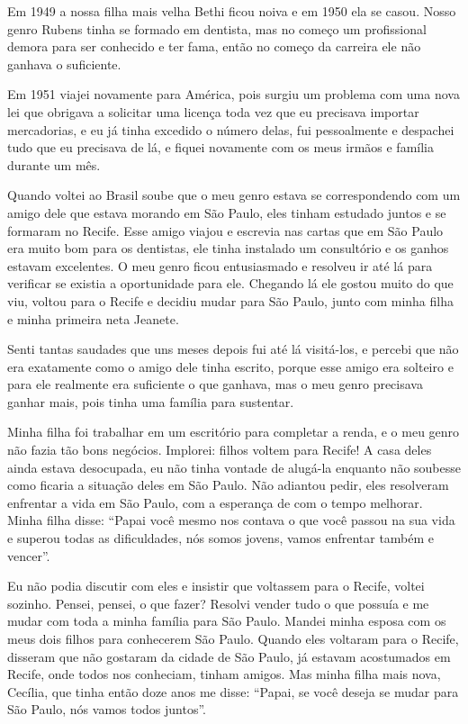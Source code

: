 Em 1949 a nossa filha mais velha Bethi ficou noiva e em 1950 ela se
casou. Nosso genro Rubens tinha se formado em dentista, mas no começo um
profissional demora para ser conhecido e ter fama, então no começo da
carreira ele não ganhava o suficiente.

Em 1951 viajei novamente para América, pois surgiu um problema com uma
nova lei que obrigava a solicitar uma licença toda vez que eu precisava
importar mercadorias, e eu já tinha excedido o número delas, fui
pessoalmente e despachei tudo que eu precisava de lá, e fiquei novamente
com os meus irmãos e família durante um mês.

Quando voltei ao Brasil soube que o meu genro estava se correspondendo
com um amigo dele que estava morando em São Paulo, eles tinham estudado
juntos e se formaram no Recife. Esse amigo viajou e escrevia nas cartas
que em São Paulo era muito bom para os dentistas, ele tinha instalado um
consultório e os ganhos estavam excelentes. O meu genro ficou
entusiasmado e resolveu ir até lá para verificar se existia a
oportunidade para ele. Chegando lá ele gostou muito do que viu, voltou
para o Recife e decidiu mudar para São Paulo, junto com minha filha e
minha primeira neta Jeanete.

Senti tantas saudades que uns meses depois fui até lá visitá-los, e
percebi que não era exatamente como o amigo dele tinha escrito, porque
esse amigo era solteiro e para ele realmente era suficiente o que
ganhava, mas o meu genro precisava ganhar mais, pois tinha uma família
para sustentar.

Minha filha foi trabalhar em um escritório para completar a renda, e o
meu genro não fazia tão bons negócios. Implorei: filhos voltem para
Recife! A casa deles ainda estava desocupada, eu não tinha vontade de
alugá-la enquanto não soubesse como ficaria a situação deles em São
Paulo. Não adiantou pedir, eles resolveram enfrentar a vida em São
Paulo, com a esperança de com o tempo melhorar. Minha filha disse:
``Papai você mesmo nos contava o que você passou na sua vida e superou
todas as dificuldades, nós somos jovens, vamos enfrentar também e
vencer''.

Eu não podia discutir com eles e insistir que voltassem para o Recife,
voltei sozinho. Pensei, pensei, o que fazer? Resolvi vender tudo o que
possuía e me mudar com toda a minha família para São Paulo. Mandei minha
esposa com os meus dois filhos para conhecerem São Paulo. Quando eles
voltaram para o Recife, disseram que não gostaram da cidade de São
Paulo, já estavam acostumados em Recife, onde todos nos conheciam,
tinham amigos. Mas minha filha mais nova, Cecília, que tinha então doze
anos me disse: ``Papai, se você deseja se mudar para São Paulo, nós
vamos todos juntos''.

